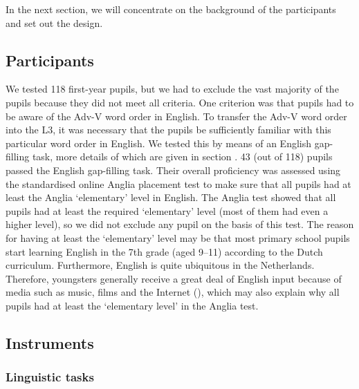 \documentclass[output=paper,modfonts,nonflat, newtxmath]{langsci/langscibook}
\begin{document}
  In the next section, we will concentrate on the background of the participants and set out the design.

\subsection{{Participants}}
\label{sec:stadt:3.2}

We tested 118 first-year pupils, but we had to exclude the vast majority of the pupils because they did not meet all criteria. One criterion was that pupils had to be aware of the Adv-V word order in English. To transfer the Adv-V word order into the L3, it was necessary that the pupils be sufficiently familiar with this particular word order in English. We tested this by means of an English gap-filling task, more details of which are given in section . 43 (out of 118) pupils passed the English gap-filling task. Their overall proficiency was assessed using the standardised online Anglia placement test to make sure that all pupils had at least the Anglia ‘elementary’ level in English. The Anglia test showed that all pupils had at least the required ‘elementary’ level (most of them had even a higher level), so we did not exclude any pupil on the basis of this test. The reason for having at least the ‘elementary’ level may be that most primary school pupils start learning English in the 7th grade (aged 9–11) according to the Dutch curriculum. Furthermore, English is quite ubiquitous in the Netherlands. Therefore, youngsters generally receive a great deal of English input because of media such as music, films and the Internet (\citealt{VerspoorEtAl2007, VerspoorEtAl2010}), which may also explain why all pupils had at least the ‘elementary level’ in the Anglia test.

\subsection{{Instruments} }%
\label{sec:stadt:3.3}
\subsubsection{{Linguistic} {tasks} }%
\label{sec:stadt:3.3.1}
\end{document}
